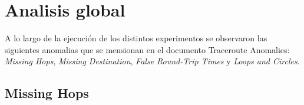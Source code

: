 \section{Analisis global}
A lo largo de la ejecución de los distintos experimentos se observaron las siguientes anomalias que se mensionan en el documento Traceroute Anomalies:
\emph{Missing Hops}, \emph{Missing Destination}, \emph{False Round-Trip Times} y \emph{Loops and Circles}.

\subsection{Missing Hops}